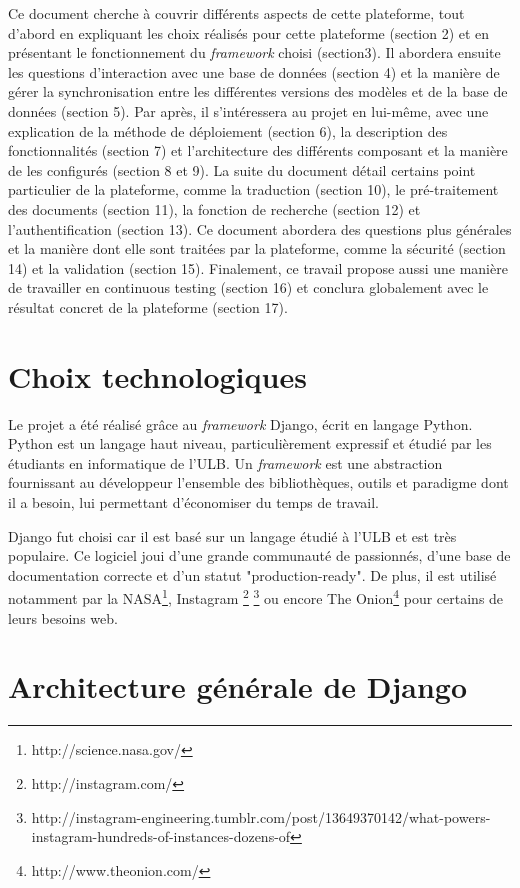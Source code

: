 \documentclass[a4paper,12pt]{article}
\begin{document}
Ce document cherche à couvrir différents aspects de cette plateforme, tout d'abord en
expliquant les choix réalisés pour cette plateforme (section 2) et en présentant
le fonctionnement du \textit{framework} choisi (section3). Il abordera ensuite
les questions d'interaction avec une base de données (section 4) et la manière
de gérer la synchronisation entre les différentes versions des modèles et de
la base de données (section 5). Par après, il s'intéressera au projet en lui-même,
avec une explication de la méthode de déploiement (section 6), la
description des fonctionnalités (section 7) et l'architecture des différents
composant et la manière de les configurés (section 8 et 9). La suite du
document détail certains point particulier de la plateforme, comme la traduction (section 10),
le pré-traitement des documents (section 11), la fonction de recherche (section 12)
et l'authentification (section 13). Ce document abordera des questions
plus générales et la manière dont elle sont traitées par la plateforme, comme la
sécurité (section 14) et la validation (section 15). Finalement, ce travail propose aussi
une manière de travailler en continuous testing (section 16) et conclura
globalement avec le résultat concret de la plateforme (section 17).


\section{Choix technologiques}

Le projet a été réalisé grâce au \textit{framework} Django, écrit en langage Python.
Python est un langage haut niveau, particulièrement expressif et étudié par
les étudiants en informatique de l'ULB. Un \textit{framework} est une abstraction
fournissant au développeur l'ensemble des bibliothèques, outils et paradigme
dont il a besoin, lui permettant d'économiser du temps de travail. 

Django fut choisi car il est basé sur un langage étudié à l'ULB et est très populaire.
Ce logiciel joui d'une grande communauté de passionnés, d'une base de documentation
correcte et d'un statut "production-ready". De plus, il est utilisé notamment
par la NASA\footnote{http://science.nasa.gov/}, Instagram
\footnote{http://instagram.com/}
\footnote{http://instagram-engineering.tumblr.com/post/13649370142/what-powers-instagram-hundreds-of-instances-dozens-of}
ou encore The Onion\footnote{http://www.theonion.com/} pour certains de leurs besoins web.


\section{Architecture générale de Django}
\end{document}
